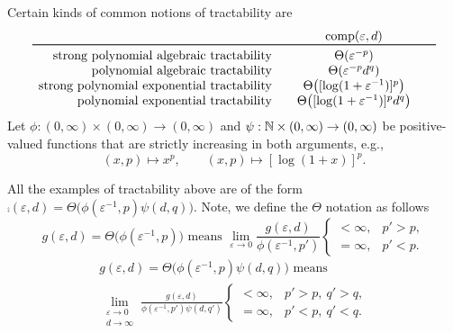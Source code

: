 \documentclass[11pt,a4paper]{article}
\begin{document}
Certain kinds of common notions of tractability are 
\begin{equation*}
    \begin{array}{r@{\qquad}c@{\qquad}c}
    & \comp(\varepsilon, d)\\
    \toprule
    \text{strong polynomial algebraic  tractability} & \Theta(\varepsilon^{-p})\\
    \text{polynomial algebraic tractability} & \Theta(\varepsilon^{-p}d^{q})\\
    \text{strong polynomial exponential tractability} &  \Theta\bigl([\log(1 + \varepsilon^{-1})]^p\bigr)\\
    \text{polynomial exponential tractability} & \Theta\bigl([\log(1 + \varepsilon^{-1})]^p  d^{q}\bigr)
    \end{array}
\end{equation*}
Let $\phi : (0,\infty) \times (0,\infty) \to (0,\infty)$ and $\psi : \mathbb{N}  \times (0,\infty) \to (0,\infty)$ be positive-valued functions that are strictly increasing in both arguments, e.g., 
\[
(x,p) \mapsto x^{p}, \qquad (x,p) \mapsto [\log(1+x)]^p.
\]

All the examples of tractability above are of the form $\comp(\varepsilon, d) = \Theta \bigl( \phi(\varepsilon^{-1},p) \psi(d,q)\bigr)$.  
Note, we define the $\Theta$ notation as follows
\begin{equation*}
     g(\varepsilon,d) = \Theta\bigl(\phi(\varepsilon^{-1},p) \bigr) \text{ means } 
    \lim_{\varepsilon \to 0} \frac{g(\varepsilon,d)}{\phi(\varepsilon^{-1},p')}
           \begin{cases} < \infty, & p'> p,  \\ 
          =\infty, & p' < p.\end{cases}
\end{equation*}
\begin{multline*}
     g(\varepsilon,d) = \Theta\bigl(\phi(\varepsilon^{-1},p) \psi(d,q) \bigr) \text{ means } \\
    \lim_{\substack{\varepsilon \to 0 \\ d \to \infty}} \frac{g(\varepsilon,d)}{\phi(\varepsilon^{-1},p') \psi(d,q')}
          \begin{cases} < \infty, & p'> p, \  q' > q,  \\ 
          =\infty, & p' < p, \ q' < q.\end{cases}
\end{multline*}
\end{document}
